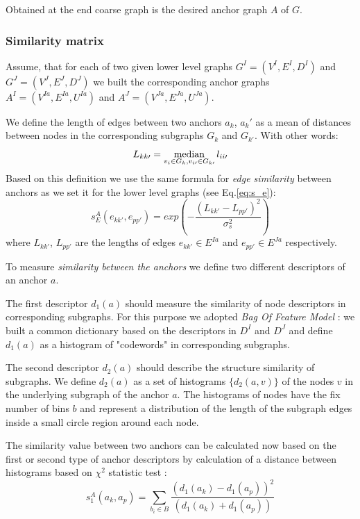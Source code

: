 Obtained at the end coarse graph is the desired anchor graph $A$ of $G$. 

\subsubsection{Similarity matrix}

Assume, that for each of two given lower level graphs $G^I = (V^I, E^I, D^I)$ and $G^J=(V^J, E^J, D^J)$ we built the corresponding anchor graphs  $A^I=(V^{Ia},E^{Ia}, U^{Ia})$ and $A^J=(V^{Ja},E^{Ja},U^{Ja})$. 

We define the length of edges between two anchors $a_k$, $a_k\prime$ as a mean of distances between nodes in the corresponding subgraphs $G_k$ and $G_{k\prime}$. With other words:
\begin{equation} L_{kk\prime} = \mathop{\rm median}_{v_i\in G_k, v_{i\prime}\in G_{k\prime}} l_{ii\prime} \end{equation}
Based on this definition we use the same formula for \emph{edge similarity} between anchors as we set it for the lower level graphs (see Eq.\ref{eq:s_e}):
\begin{equation} 
s^A_E(e_{kk\prime}, e_{pp\prime}) = exp(-\frac{(L_{kk\prime} - L_{pp\prime})^2}{\sigma^2_{s}})
\label{eq:s_e_A}
\end{equation}
where $L_{kk\prime}$, $L_{pp\prime} $ are the lengths of edges $e_{kk\prime}\in E^{Ia}$ and $e_{pp\prime}\in E^{Ja}$ respectively.

To measure \emph{similarity between the anchors} we  define two different descriptors of an anchor $a$.

The first descriptor $d_1(a)$ should measure the similarity of node descriptors in corresponding subgraphs. For this purpose we adopted \emph{Bag Of Feature Model} : we built a common dictionary based on the descriptors in $D^I$ and $D^J$ and define $d_1(a)$ as a histogram of "codewords" in corresponding subgraphs.

The second descriptor $d_2(a)$ should describe the structure similarity of subgraphs. We define $d_2(a)$ as a set of histograms $\{d_2(a,v)\}$ of the nodes $v$ in the underlying subgraph of the anchor $a$. The histograms of nodes have the fix number of bins $b$ and represent a distribution of the length of the subgraph edges inside a small circle region around each node. 

The similarity value between two anchors can be calculated now based on the first or second type of anchor descriptors by calculation of a distance between histograms based on $\chi^2$ statistic test \cite{Weken2004_ChiSqTest}:
\begin{equation}
s^A_1(a_k, a_p) = \sum_{b_i\in B}\frac{(d_1(a_k)-d_1(a_p))^2}{(d_1(a_k)+d_1(a_p))}
\end{equation}

